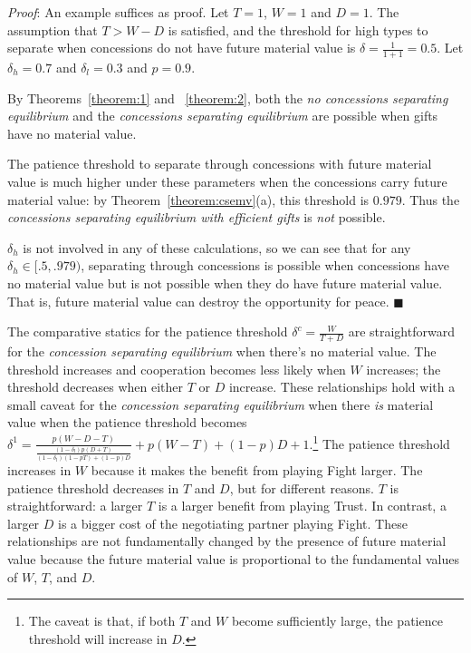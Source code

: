 \documentclass[12pt, letterpaper]{article}
\newcommand{\de}{\delta}
\begin{document}
\emph{Proof}: An example suffices as proof. Let $T = 1$, $W=1$ and $D = 1$. The assumption that $T > W - D$ is satisfied, and the threshold for high types to separate when concessions do not have future material value is $\de = \frac{1}{1+1} = 0.5$. Let $\de_h = 0.7$ and $\de_l = 0.3$ and $p = 0.9$.

By Theorems~\ref{theorem:1} and ~\ref{theorem:2}, both the \emph{no concessions separating equilibrium} and the \emph{concessions separating equilibrium} are possible when gifts have no material value.

The patience threshold to separate through concessions with future material value is much higher under these parameters when the concessions carry future material value: by Theorem~\ref{theorem:csemv}(a), this threshold is $0.979$. Thus the \emph{concessions separating equilibrium with efficient gifts} is \emph{not} possible. 

$\de_h$ is not involved in any of these calculations, so we can see that for any $\de_h \in [.5,.979)$, separating through concessions is possible when concessions have no material value but is not possible when they do have future material value. That is, future material value can destroy the opportunity for peace. \hfill $\blacksquare$ 

The comparative statics for the patience threshold $\de^c = \frac{W}{T+D}$ are straightforward for the \emph{concession separating equilibrium} when there's no material value. The threshold increases and cooperation becomes less likely when $W$ increases; the threshold decreases when either $T$ or $D$ increase. These relationships hold with a small caveat for the \emph{concession separating equilibrium} when there \emph{is} material value when the patience threshold becomes $\de^{1} = \frac{p(W-D-T)}{\frac{\left(1-\de_l\right)p\left(D + T\right)}{\left(1-\de_l\right)\left(1 - pT \right) + (1-p) D}} + p (W-T) + (1-p)D + 1$.\footnote{The caveat is that, if both $T$ and $W$ become sufficiently large, the patience threshold will increase in $D$.} The patience threshold increases in $W$ because it makes the benefit from playing Fight larger. The patience threshold decreases in $T$ and $D$, but for different reasons. $T$ is straightforward: a larger $T$ is a larger benefit from playing Trust. In contrast, a larger $D$ is a bigger cost of the negotiating partner playing Fight. These relationships are not fundamentally changed by the presence of future material value because the future material value is proportional to the fundamental values of $W$, $T$, and $D$.
\end{document}
